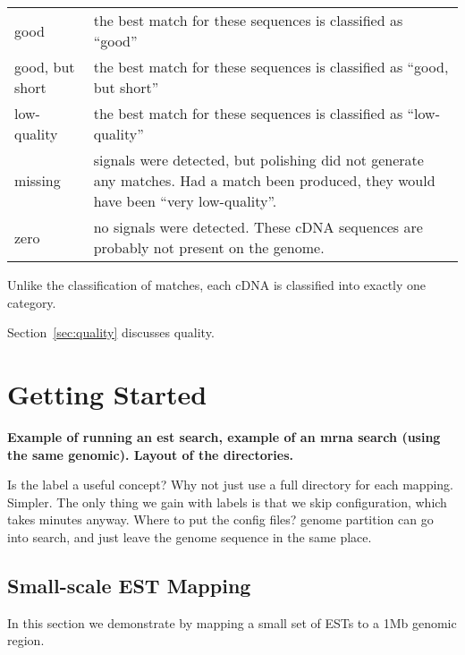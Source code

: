 \documentclass[twoside,11pt]{book}
\begin{document}
\begin{tabular}{|p{1.7in}|p{3.0in}|}
\hline
good             & the best match for these sequences is classified as ``good'' \\
good, but short  & the best match for these sequences is classified as ``good, but short'' \\
low-quality      & the best match for these sequences is classified as ``low-quality'' \\
missing          & signals were detected, but polishing did not generate
                   any matches.  Had a match been produced, they would have been
                   ``very low-quality''. \\
zero             & no signals were detected.  These cDNA sequences are probably not
                   present on the genome. \\
\hline
\end{tabular}

Unlike the classification of matches, each cDNA is classified into exactly one category.

Section~\ref{sec:quality} discusses quality.


\chapter{Getting Started}
\label{chap:start}

{\bf
Example of running an est search, example of an mrna search (using the
same genomic).  Layout of the directories.
}

Is the label a useful concept?  Why not just use a full directory for
each mapping.  Simpler.  The only thing we gain with labels is that we
skip configuration, which takes minutes anyway.  Where to put the
config files?  genome partition can go into search, and just leave the
genome sequence in the same place.

%
%

\section{Small-scale EST Mapping}

In this section we demonstrate \ESTmapper by mapping a small set of ESTs to a 1Mb genomic region.
\end{document}
